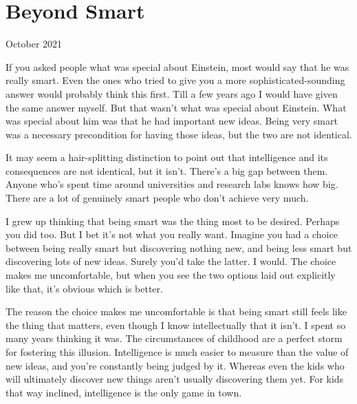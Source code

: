 \chapter{Beyond Smart}


            
              
                

October 2021

If you asked people what was special
                  about Einstein, most would say that he was really smart. Even
                  the ones who tried to give you a more sophisticated-sounding
                  answer would probably think this first. Till a few years ago I
                  would have given the same answer myself. But that wasn't what
                  was special about Einstein. What was special about him was
                  that he had important new ideas. Being very smart was a
                  necessary precondition for having those ideas, but the two are
                  not identical.

It may seem a hair-splitting
                  distinction to point out that intelligence and its
                  consequences are not identical, but it isn't. There's a big
                  gap between them. Anyone who's spent time around universities
                  and research labs knows how big. There are a lot of genuinely
                  smart people who don't achieve very much.

I grew up
                  thinking that being smart was the thing most to be desired.
                  Perhaps you did too. But I bet it's not what you really want.
                  Imagine you had a choice between being really smart but
                  discovering nothing new, and being less smart but discovering
                  lots of new ideas. Surely you'd take the latter. I would. The
                  choice makes me uncomfortable, but when you see the two
                  options laid out explicitly like that, it's obvious which is
                  better.

The reason the choice makes me
                  uncomfortable is that being smart still feels like the thing
                  that matters, even though I know intellectually that it isn't.
                  I spent so many years thinking it was. The circumstances of
                  childhood are a perfect storm for fostering this illusion.
                  Intelligence is much easier to measure than the value of new
                  ideas, and you're constantly being judged by it. Whereas even
                  the kids who will ultimately discover new things aren't
                  usually discovering them yet. For kids that way inclined,
                  intelligence is the only game in town.

